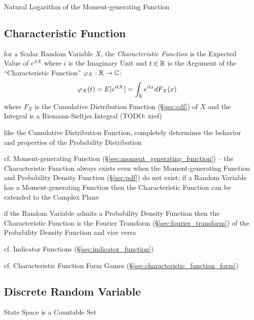 Natural Logarithm of the Moment-generating Function



\subsection{Characteristic Function}\label{sec:characteristic_function}

for a Scalar Random Variable $X$, the \emph{Characteristic Function} is the
Expected Value of $e^{itX}$ where $i$ is the Imaginary Unit and $t \in \mathbb{R}$
is the Argument of the ``Characteristic Function'' $\varphi_X : \mathbb{R}
\rightarrow \mathbb{C}$:
\[
  \varphi_X(t) = E[e^{itX}] = \int_{\mathbb{R}} e^{itx} dF_X(x)
\]
where $F_X$ is the Cumulative Distribution Function (\S\ref{sec:cdf}) of $X$ and
the Integral is a Riemann-Sieltjes Integral (TODO: xref)

like the Cumulative Distribution Function, completely determines the behavior
and properties of the Probability Distribution

cf. Moment-generating Function (\S\ref{sec:moment_generating_function}) --
the Characteristic Function always exists even when the Moment-generating
Function and Probability Density Function (\S\ref{sec:pdf}) do not exist;
if a Random Variable has a Moment-generating Function then the Characteristic
Function can be extended to the Complex Plane

if the Random Variable admits a Probability Density Function then the
Characteristic Function is the Fourier Transform (\S\ref{sec:fourier_transform})
of the Probability Density Function and vice versa

\fist cf. Indicator Functions (\S\ref{sec:indicator_function})

cf. Characteristic Function Form Games
(\S\ref{sec:characteristic_function_form})



\subsection{Discrete Random Variable}\label{sec:discrete_random_variable}

State Space is a Countable Set


